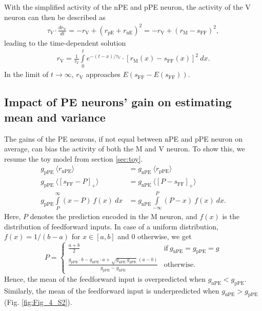 \documentclass[10pt,a4paper]{article}
\providecommand{\DIFaddtex}[1]{{\protect\color{blue}\uwave{#1}}} %
\providecommand{\DIFaddbegin}{} %
\providecommand{\DIFaddend}{} %
\providecommand{\DIFadd}[1]{\texorpdfstring{\DIFaddtex{#1}}{#1}} %
\newcommand{\DIFaddincludegraphics}[2][]{{\color{blue}\fbox{\DIFOincludegraphics[#1]{#2}}}} %
\DeclareRobustCommand{\DIFaddbegin}{\DIFOaddbegin \let\includegraphics\DIFaddincludegraphics} %
\DeclareRobustCommand{\DIFaddend}{\DIFOaddend \let\includegraphics\DIFOincludegraphics} %
\begin{document}
With the simplified activity of the nPE and pPE neuron, the activity of the V neuron can then be described as
%
\begin{align}
\tau_V \cdot \frac{dr_\mathrm{V}}{dt} = -r_\mathrm{V} + (r_\mathrm{pE} +  r_\mathrm{nE})^2 = -r_\mathrm{V}  + (r_\mathrm{M} -  s_\mathrm{FF})^2,
\end{align}
%
leading to the time-dependent solution
%
\begin{align}
r_\mathrm{V} = \frac{1}{\tau_V} \int\limits_0^t e^{-(t-x)/\tau_V}\cdot \left[r_\mathrm{M}(x) -  s_\mathrm{FF}(x)\right]^2\ dx.
\end{align}  
%
In the limit of $t\rightarrow \infty$, $r_\mathrm{V}$ approaches $E(s_\mathrm{FF} - E(s_\mathrm{FF}))$.


\subsection{Impact of PE neurons' gain on estimating mean and variance}\label{sec:impact_gain}\label{sec:gain_impact}
%
The gains of the PE neurons, if not equal between \DIFaddbegin \DIFadd{the }\DIFaddend nPE and pPE neuron on average, can bias the activity of both the M and V neuron. To show this, we resume the toy model from section \ref{sec:toy}. 
%
\begin{align}
\label{eq:condition_mean_gain_equal}
g_\mathrm{pPE}\ \langle r_\mathrm{nPE}\rangle &= g_\mathrm{nPE}\ \langle r_\mathrm{pPE}\rangle \\
g_\mathrm{pPE}\ \langle \left[ s_\mathrm{FF}-P\right]_+\rangle &= g_\mathrm{nPE}\ \langle \left[ P-s_\mathrm{FF}\right]_+\rangle \nonumber\\
g_\mathrm{pPE} \int\limits_P^{\infty} \left( x-P\right)\ f(x)\ dx &= g_\mathrm{nPE} \int\limits_{-\infty}^P \left( P-x\right)\ f(x)\ dx. \nonumber
\end{align}
%
Here, $P$ denotes the prediction encoded in the M neuron, and $f(x)$ is the distribution of feedforward inputs. In case of a uniform distribution, $f(x) = 1/(b-a)$ for $x\in [a,b]$ and $0$ otherwise, we get
%
\begin{equation}
\label{eq:prediction_gain}
    P=
    \begin{cases}
      \frac{a + b}{2} & \text{if}\ g_\mathrm{nPE} = g_\mathrm{pPE} = g \\
      \frac{g_\mathrm{pPE}\cdot b - g_\mathrm{nPE}\cdot a + \sqrt{g_\mathrm{nPE}\ g_\mathrm{pPE}}\ (a-b)}{g_\mathrm{pPE} - g_\mathrm{nPE}} & \text{otherwise.}
    \end{cases}
\end{equation}
%
Hence, the mean of the feedforward input is overpredicted when $g_\mathrm{nPE} < g_\mathrm{pPE}$. Similarly, the mean of the feedforward input is underpredicted when $g_\mathrm{nPE} > g_\mathrm{pPE}$ (Fig. \ref{fig:Fig_4_S2}).
\end{document}
